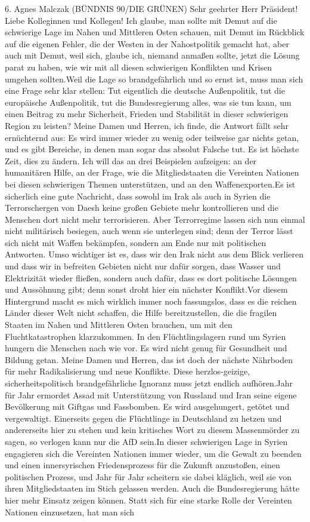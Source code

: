 \documentclass{article}
\begin{document}
	6. Agnes Malczak (BÜNDNIS 90/DIE GRÜNEN) Sehr geehrter Herr Präsident! Liebe Kolleginnen und Kollegen! Ich glaube, man sollte mit Demut auf die schwierige Lage im Nahen und Mittleren Osten schauen, mit Demut im Rückblick auf die eigenen Fehler, die der Westen in der Nahostpolitik gemacht hat, aber auch mit Demut, weil sich, glaube ich, niemand anmaßen sollte, jetzt die Lösung parat zu haben, wie wir mit all diesen schwierigen Konflikten und Krisen umgehen sollten.Weil die Lage so brandgefährlich und so ernst ist, muss man sich eine Frage sehr klar stellen: Tut eigentlich die deutsche Außenpolitik, tut die europäische Außenpolitik, tut die Bundesregierung alles, was sie tun kann, um einen Beitrag zu mehr Sicherheit, Frieden und Stabilität in dieser schwierigen Region zu leisten? Meine Damen und Herren, ich finde, die Antwort fällt sehr ernüchternd aus: Es wird immer wieder zu wenig oder teilweise gar nichts getan, und es gibt Bereiche, in denen man sogar das absolut Falsche tut. Es ist höchste Zeit, dies zu ändern. Ich will das an drei Beispielen aufzeigen: an der humanitären Hilfe, an der Frage, wie die Mitgliedstaaten die Vereinten Nationen bei diesen schwierigen Themen unterstützen, und an den Waffenexporten.Es ist sicherlich eine gute Nachricht, dass sowohl im Irak als auch in Syrien die Terrorschergen von Daesh keine großen Gebiete mehr kontrollieren und die Menschen dort nicht mehr terrorisieren. Aber Terrorregime lassen sich nun einmal nicht militärisch besiegen, auch wenn sie unterlegen sind; denn der Terror lässt sich nicht mit Waffen bekämpfen, sondern am Ende nur mit politischen Antworten. Umso wichtiger ist es, dass wir den Irak nicht aus dem Blick verlieren und dass wir in befreiten Gebieten nicht nur dafür sorgen, dass Wasser und Elektrizität wieder fließen, sondern auch dafür, dass es dort politische Lösungen und Aussöhnung gibt; denn sonst droht hier ein nächster Konflikt.Vor diesem Hintergrund macht es mich wirklich immer noch fassungslos, dass es die reichen Länder dieser Welt nicht schaffen, die Hilfe bereitzustellen, die die fragilen Staaten im Nahen und Mittleren Osten brauchen, um mit den Fluchtkatastrophen klarzukommen. In den Flüchtlingslagern rund um Syrien hungern die Menschen nach wie vor. Es wird nicht genug für Gesundheit und Bildung getan. Meine Damen und Herren, das ist doch der nächste Nährboden für mehr Radikalisierung und neue Konflikte. Diese herzlos-geizige, sicherheitspolitisch brandgefährliche Ignoranz muss jetzt endlich aufhören.Jahr für Jahr ermordet Assad mit Unterstützung von Russland und Iran seine eigene Bevölkerung mit Giftgas und Fassbomben. Es wird ausgehungert, getötet und vergewaltigt. Einerseits gegen die Flüchtlinge in Deutschland zu hetzen und andererseits hier zu stehen und kein kritisches Wort zu diesem Massenmörder zu sagen, so verlogen kann nur die AfD sein.In dieser schwierigen Lage in Syrien engagieren sich die Vereinten Nationen immer wieder, um die Gewalt zu beenden und einen innersyrischen Friedensprozess für die Zukunft anzustoßen, einen politischen Prozess, und Jahr für Jahr scheitern sie dabei kläglich, weil sie von ihren Mitgliedstaaten im Stich gelassen werden. Auch die Bundesregierung hätte hier mehr Einsatz zeigen können. Statt sich für eine starke Rolle der Vereinten Nationen einzusetzen, hat man sich 
\end{document}
